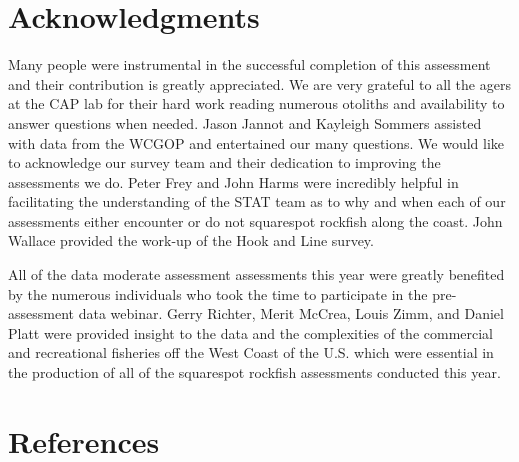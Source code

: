 \documentclass[11pt,
  english,
  a4paper,
]{article}
\begin{document}
\tagstructend


\hypertarget{acknowledgments}{%
\section{Acknowledgments}\label{acknowledgments}}

\leavevmode\tagmcend\tagstructend


Many people were instrumental in the successful completion of this assessment and their contribution is greatly appreciated. We are very grateful to all the agers at the CAP lab for their hard work reading numerous otoliths and availability to answer questions when needed. Jason Jannot and Kayleigh Sommers assisted with data from the WCGOP and entertained our many questions. We would like to acknowledge our survey team and their dedication to improving the assessments we do. Peter Frey and John Harms were incredibly helpful in facilitating the understanding of the STAT team as to why and when each of our assessments either encounter or do not squarespot rockfish along the coast. John Wallace provided the work-up of the Hook and Line survey.

\leavevmode\tagmcend\tagstructend\par


All of the data moderate assessment assessments this year were greatly benefited by the numerous individuals who took the time to participate in the pre-assessment data webinar. Gerry Richter, Merit McCrea, Louis Zimm, and Daniel Platt were provided insight to the data and the complexities of the commercial and recreational fisheries off the West Coast of the U.S. which were essential in the production of all of the squarespot rockfish assessments conducted this year.

\leavevmode\tagmcend\tagstructend\par

\newpage

\clearpage


\hypertarget{references}{%
\section{References}\label{references}}
\end{document}
